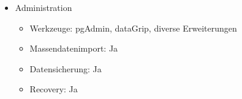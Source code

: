 \begin{itemize}
\begin{itemize}
        \end{itemize}
        \item Administration
        \begin{itemize}
            \item Werkzeuge: pgAdmin, dataGrip, diverse Erweiterungen
            \item Massendatenimport: Ja
            \item Datensicherung: Ja
            \item Recovery: Ja
        \end{itemize}
    \end{itemize}
\newpage
